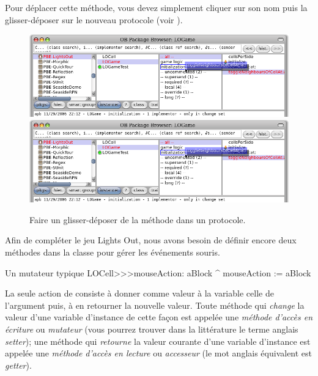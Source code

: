 \documentclass[a4paper,10pt,twoside]{book}
\begin{document}
Pour déplacer cette méthode, vous devez simplement cliquer sur son nom
puis la glisser-déposer sur le nouveau protocole (voir ).

\begin{figure}[htbp]
   \centering
   \ifluluelse
		{\includegraphics[width=\textwidth]{DragMethod} }
		{\includegraphics[scale=0.7]{DragMethod} }
   \caption{Faire un glisser-déposer de la méthode dans un protocole.}
\end{figure}

Afin de compléter le jeu Lights Out, nous avons besoin de définir encore deux méthodes dans la classe  pour gérer les événements souris.
\begin{method}[mouseAction:]{Un mutateur typique}
LOCell>>>mouseAction: aBlock
   ^ mouseAction := aBlock
\end{method}

La seule action de  consiste à donner comme
valeur à la variable  celle de l'argument puis, à en
retourner la nouvelle valeur. Toute méthode qui \emph{change} la
valeur d'une variable d'instance de cette façon est appelée une
\emph{méthode d'accès en écriture} ou \emph{mutateur} (vous pourrez
trouver dans la littérature le terme anglais \emph{setter}); une
méthode qui \emph{retourne} la valeur courante d'une variable
d'instance est appelée une \emph{méthode d'accès en lecture} ou
\emph{accesseur} (le mot anglais équivalent est \emph{getter}).
\end{document}
